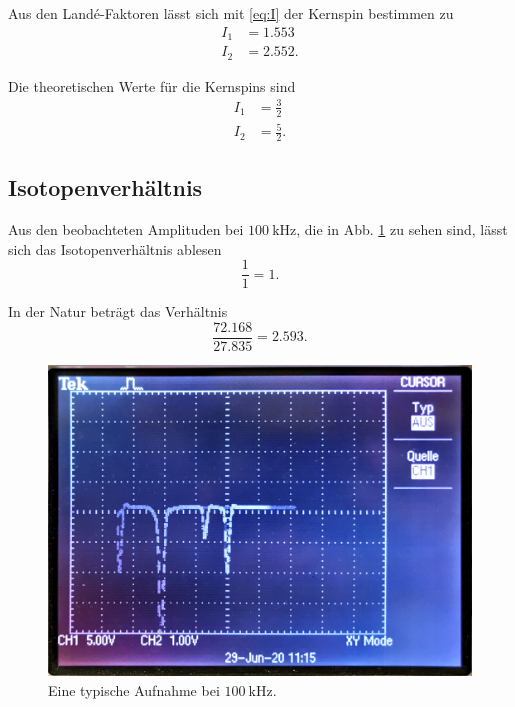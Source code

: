 Aus den Landé-Faktoren lässt sich mit \ref{eq:I} der Kernspin bestimmen zu
\begin{align*}
    I_1 &= \num{1.553} \\
    I_2 &= \num{2.552}.
\end{align*}

Die theoretischen Werte für die Kernspins sind
\begin{align*}
    I_1 &= \frac{3}{2} \\
    I_2 &= \frac{5}{2}.
\end{align*}


\subsection{Isotopenverhältnis}
Aus den beobachteten Amplituden bei $\SI{100}{\kilo\hertz}$, die in Abb. \ref{fig:Aufnahme} zu sehen sind, lässt sich das Isotopenverhältnis ablesen
\begin{equation*}
    \frac{1}{1} = 1. %
\end{equation*}

In der Natur beträgt das Verhältnis
\begin{equation*}
    \frac{72.168}{27.835} = 2.593.
\end{equation*}

\begin{figure}
    \centering
    \includegraphics[width=15cm]{fotos/Aufnahme.JPG}
    \caption{Eine typische Aufnahme bei $\SI{100}{\kilo\hertz}$.}
    \label{fig:Aufnahme}
\end{figure}
